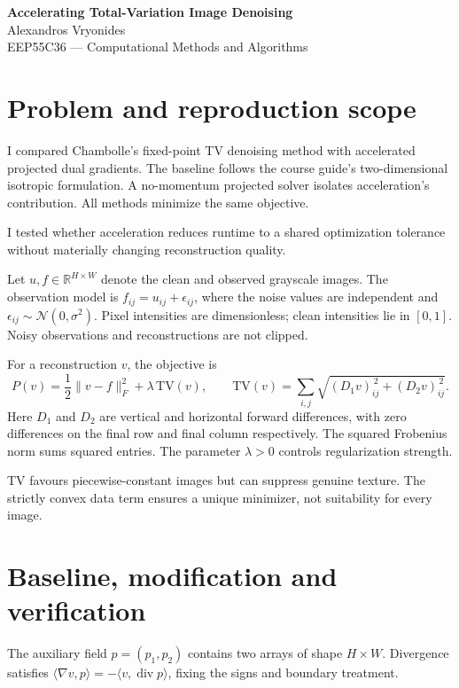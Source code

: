 \documentclass[10pt,a4paper]{article}
\begin{document}
\begin{center}
    {\Large\bfseries Accelerating Total-Variation Image Denoising}\\[4pt]
    Alexandros Vryonides\\
    EEP55C36 --- Computational Methods and Algorithms
\end{center}

\section{Problem and reproduction scope}

I compared Chambolle's fixed-point TV denoising method with accelerated projected dual gradients. The baseline follows the course guide's
two-dimensional isotropic formulation.
A no-momentum projected solver isolates acceleration's contribution.
All methods minimize the same objective.

I tested whether acceleration reduces runtime to a shared optimization
tolerance without materially changing reconstruction quality.

Let $u,f\in\mathbb{R}^{H\times W}$ denote the clean and observed
grayscale images. The observation model is
$f_{ij}=u_{ij}+\epsilon_{ij}$, where the noise values are independent
and $\epsilon_{ij}\sim\mathcal{N}(0,\sigma^2)$.
Pixel intensities are dimensionless; clean intensities lie in $[0,1]$.
Noisy observations and reconstructions are not clipped.

For a reconstruction $v$, the objective is
\begin{equation}
 P(v)=\frac12\|v-f\|_F^2+\lambda\,\mathrm{TV}(v),
 \qquad
 \mathrm{TV}(v)=
 \sum_{i,j}\sqrt{(D_1v)_{ij}^{\,2}+(D_2v)_{ij}^{\,2}}.
 \label{eq:objective}
\end{equation}
Here $D_1$ and $D_2$ are vertical and horizontal forward differences,
with zero differences on the final row and final column respectively.
The squared Frobenius norm sums squared entries.
The parameter $\lambda>0$ controls regularization strength.

TV favours piecewise-constant images but can suppress genuine texture.
The strictly convex data term ensures a unique minimizer, not
suitability for every image.

\section{Baseline, modification and verification}

The auxiliary field $p=(p_1,p_2)$ contains two arrays of shape
$H\times W$. Divergence satisfies
$\langle\nabla v,p\rangle=-\langle v,\operatorname{div}p\rangle$,
fixing the signs and boundary treatment.
\end{document}
